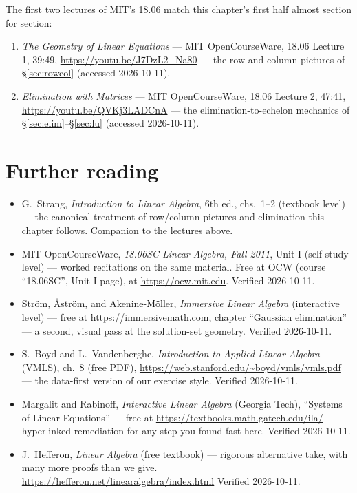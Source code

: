 \begin{rulebox}
The first two lectures of MIT's 18.06 match this chapter's first half
almost section for section:
\begin{enumerate}
\item \emph{The Geometry of Linear Equations} --- MIT OpenCourseWare,
18.06 Lecture 1, 39:49,
\url{https://youtu.be/J7DzL2_Na80} --- the row and column pictures of
\S\ref{sec:rowcol} (accessed 2026-10-11).
\item \emph{Elimination with Matrices} --- MIT OpenCourseWare, 18.06
Lecture 2, 47:41, \url{https://youtu.be/QVKj3LADCnA} --- the
elimination-to-echelon mechanics of \S\ref{sec:elim}--\S\ref{sec:lu}
(accessed 2026-10-11).
\end{enumerate}
\end{rulebox}

\section*{Further reading}

\begin{itemize}
\item G.~Strang, \emph{Introduction to Linear Algebra}, 6th ed., chs.~1--2
(textbook level) --- the canonical treatment of row/column pictures and
elimination this chapter follows. Companion to the lectures above.
\item MIT OpenCourseWare, \emph{18.06SC Linear Algebra, Fall 2011},
Unit I (self-study level) --- worked recitations on the same material.
Free at OCW (course ``18.06SC'', Unit I page), at
\url{https://ocw.mit.edu}. Verified 2026-10-11.
\item Str\"om, \AA str\"om, and Akenine-M\"oller, \emph{Immersive Linear
Algebra} (interactive level) --- free at \url{https://immersivemath.com},
chapter ``Gaussian elimination'' --- a second, visual pass at the
solution-set geometry. Verified 2026-10-11.
\item S.~Boyd and L.~Vandenberghe, \emph{Introduction to Applied Linear
Algebra} (VMLS), ch.~8 (free PDF),
\url{https://web.stanford.edu/~boyd/vmls/vmls.pdf} --- the data-first
version of our exercise style. Verified 2026-10-11.
\item Margalit and Rabinoff, \emph{Interactive Linear Algebra} (Georgia
Tech), ``Systems of Linear Equations'' --- free at
\url{https://textbooks.math.gatech.edu/ila/} --- hyperlinked
remediation for any step you found fast here. Verified 2026-10-11.
\item J.~Hefferon, \emph{Linear Algebra} (free textbook) --- rigorous
alternative take, with many more proofs than we give.\newline
\url{https://hefferon.net/linearalgebra/index.html}
Verified 2026-10-11.
\end{itemize}

